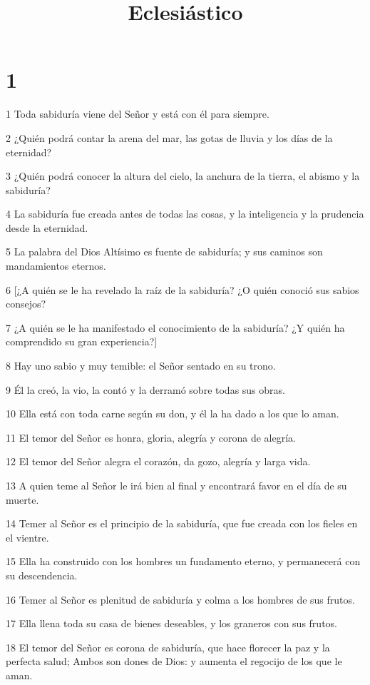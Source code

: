

\title{Eclesiástico}


\chapter{1}

\par 1 Toda sabiduría viene del Señor y está con él para siempre.
\par 2 ¿Quién podrá contar la arena del mar, las gotas de lluvia y los días de la eternidad?
\par 3 ¿Quién podrá conocer la altura del cielo, la anchura de la tierra, el abismo y la sabiduría?
\par 4 La sabiduría fue creada antes de todas las cosas, y la inteligencia y la prudencia desde la eternidad.
\par 5 La palabra del Dios Altísimo es fuente de sabiduría; y sus caminos son mandamientos eternos.
\par 6 [¿A quién se le ha revelado la raíz de la sabiduría? ¿O quién conoció sus sabios consejos?
\par 7 ¿A quién se le ha manifestado el conocimiento de la sabiduría? ¿Y quién ha comprendido su gran experiencia?]
\par 8 Hay uno sabio y muy temible: el Señor sentado en su trono.
\par 9 Él la creó, la vio, la contó y la derramó sobre todas sus obras.
\par 10 Ella está con toda carne según su don, y él la ha dado a los que lo aman.
\par 11 El temor del Señor es honra, gloria, alegría y corona de alegría.
\par 12 El temor del Señor alegra el corazón, da gozo, alegría y larga vida.
\par 13 A quien teme al Señor le irá bien al final y encontrará favor en el día de su muerte.
\par 14 Temer al Señor es el principio de la sabiduría, que fue creada con los fieles en el vientre.
\par 15 Ella ha construido con los hombres un fundamento eterno, y permanecerá con su descendencia.
\par 16 Temer al Señor es plenitud de sabiduría y colma a los hombres de sus frutos.
\par 17 Ella llena toda su casa de bienes deseables, y los graneros con sus frutos.
\par 18 El temor del Señor es corona de sabiduría, que hace florecer la paz y la perfecta salud; Ambos son dones de Dios: y aumenta el regocijo de los que le aman.
